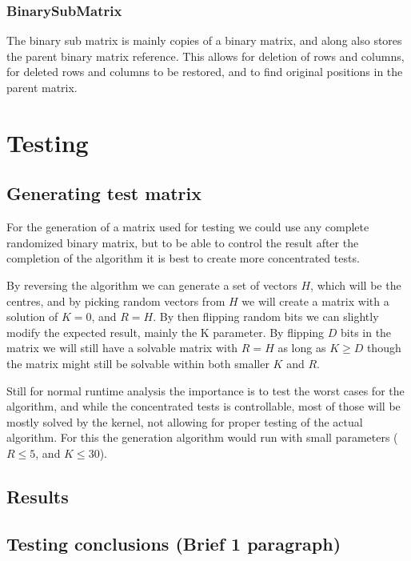 \documentclass[a4paper]{article}
\begin{document}
\subsubsection{BinarySubMatrix}
The binary sub matrix is mainly copies of a binary matrix, and along also stores the parent
binary matrix reference. This allows for deletion of rows and columns, for deleted rows and
columns to be restored, and to find original positions in the parent matrix.

%
%
\newpage

\section{Testing}
\subsection{Generating test matrix}
For the generation of a matrix used for testing we could use any complete randomized binary
matrix, but to be able to control the result after the completion of the algorithm it is best
to create more concentrated tests.



By reversing the algorithm we can generate a set of vectors $H$, which will be the centres,
and by picking random vectors from $H$ we will create a matrix with a solution of $K=0$,
and $R=H$. By then flipping random bits we can slightly modify the expected result, mainly
the K parameter. By flipping $D$ bits in the matrix we will still have a solvable matrix
with $R = H$ as long as $K \geq D$ though the matrix might still be solvable within both
smaller $K$ and $R$.


Still for normal runtime analysis the importance is to test the worst cases for the algorithm,
and while the concentrated tests is controllable, most of those will be mostly solved by the
kernel, not allowing for proper testing of the actual algorithm. For this the generation
algorithm would run with small parameters ($R \leq 5$, and $K \leq 30$).

\subsection{Results}
\subsection{Testing conclusions (Brief 1 paragraph)}
\end{document}
